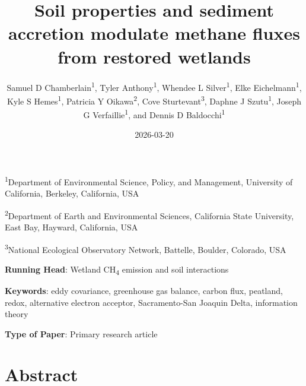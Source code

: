 \documentclass[
  12pt,
]{article}
\title{Soil properties and sediment accretion modulate methane fluxes
from restored wetlands}
\author{Samuel D Chamberlain\textsuperscript{1}, Tyler
Anthony\textsuperscript{1}, Whendee L Silver\textsuperscript{1}, Elke
Eichelmann\textsuperscript{1}, Kyle S Hemes\textsuperscript{1}, Patricia
Y Oikawa\textsuperscript{2}, Cove Sturtevant\textsuperscript{3}, Daphne
J Szutu\textsuperscript{1}, Joseph G Verfaillie\textsuperscript{1}, and
Dennis D Baldocchi\textsuperscript{1}}
\date{2026-03-20}
\begin{document}
\maketitle

\textsuperscript{1}Department of Environmental Science, Policy, and
Management, University of California, Berkeley, California, USA

\textsuperscript{2}Department of Earth and Environmental Sciences,
California State University, East Bay, Hayward, California, USA

\textsuperscript{3}National Ecological Observatory Network, Battelle,
Boulder, Colorado, USA

\textbf{Running Head}: Wetland CH\textsubscript{4} emission and soil
interactions

\textbf{Keywords}: eddy covariance, greenhouse gas balance, carbon flux,
peatland, redox, alternative electron acceptor, Sacramento-San Joaquin
Delta, information theory

\textbf{Type of Paper}: Primary research article

\newpage

\section{Abstract}\label{abstract}
\end{document}
